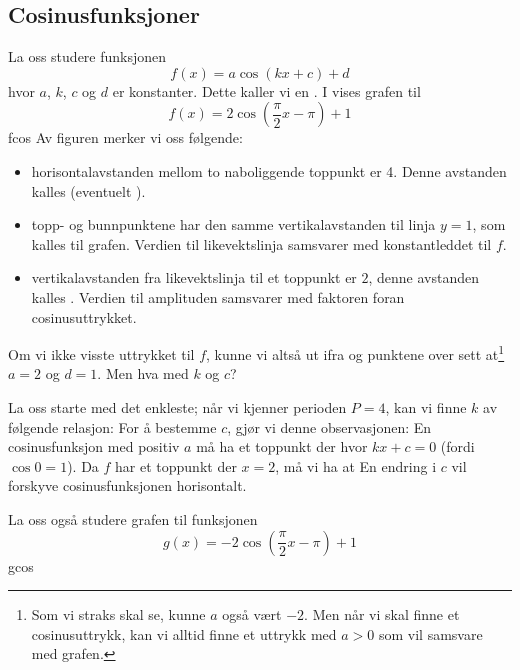 \subsection{Cosinusfunksjoner}
La oss studere funksjonen
\[ 	f(x) = a\cos (kx+c) + d  \]
hvor $ a $, $ k $, $ c $ og $ d $ er konstanter. Dette kaller vi en . I  vises grafen til
\[ f(x)= 2\cos\left(\frac{\pi}{2}x-\pi \right)+1  \]
{fcos} 
Av figuren merker vi oss følgende:
\begin{itemize}
	\item horisontalavstanden mellom to naboliggende toppunkt er 4. Denne avstanden kalles  (eventuelt ).	
	\item topp- og bunnpunktene har den samme vertikalavstanden til linja $ {y=1} $, som kalles   til grafen. Verdien til likevektslinja samsvarer med konstantleddet til $ f $.
	\item vertikalavstanden fra likevektslinja til et toppunkt er $ 2 $, denne avstanden kalles . Verdien til amplituden samsvarer med faktoren foran cosinusuttrykket.
\end{itemize}
Om vi ikke visste uttrykket til $ f $, kunne vi altså ut ifra   og punktene over sett at\footnote{Som vi straks skal se, kunne $ a $ også vært $ -2 $. Men når vi skal finne et cosinusuttrykk, kan vi alltid finne et uttrykk med ${ a>0} $ som vil samsvare med grafen.} $ {a=2} $ og $ {d=1} $. Men hva med $ k $ og $ c $? \vsk

La oss starte med det enkleste; når vi kjenner perioden $ {P=4 }$, kan vi finne  $ k $ av følgende relasjon:
For å bestemme  $ c $, gjør vi denne observasjonen: En cosinusfunksjon med positiv $ a $ må ha et toppunkt der hvor $ {kx+c=0} $ (fordi $ \cos 0=1 $). Da $ f $ har et toppunkt der $ {x=2} $, må vi ha at
En endring i $ c $ vil forskyve cosinusfunksjonen horisontalt.\vsk

La oss også studere grafen til funksjonen
\[ {g(x) = -2\cos\left(\frac{\pi}{2}x-\pi\right)+1} \]
{gcos}

